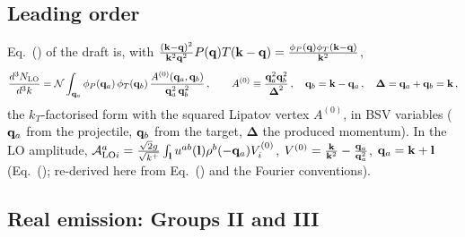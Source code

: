 \subsection{Leading order}
Eq.~() of the draft is, with $\frac{(\mathbf{k}-\mathbf{q})^2}{\mathbf{k}^2\mathbf{q}^2}P(\mathbf{q})T(\mathbf{k}-\mathbf{q})=\frac{\phi_P(\mathbf{q})\phi_T(\mathbf{k}-\mathbf{q})}{\mathbf{k}^2}$,
\begin{align}
\frac{d^3N_{\rm LO}}{d^3k}=\mathcal N\int_{\mathbf{q}_a}\phi_P(\mathbf{q}_a)\,\phi_T(\mathbf{q}_b)\,\frac{A^{(0)}(\mathbf{q}_a,\mathbf{q}_b)}{\mathbf{q}_a^2\,\mathbf{q}_b^2}\,,\qquad A^{(0)}\equiv\frac{\mathbf{q}_a^2\mathbf{q}_b^2}{\boldsymbol\Delta^2}\,,\quad\mathbf{q}_b=\mathbf{k}-\mathbf{q}_a\,,\quad\boldsymbol\Delta=\mathbf{q}_a+\mathbf{q}_b=\mathbf{k}\,,\label{d:LO}
\end{align}
the $k_T$-factorised form with the squared Lipatov vertex $A^{(0)}$, in BSV variables ($\mathbf{q}_a$ from the projectile, $\mathbf{q}_b$ from the target, $\boldsymbol\Delta$ the produced momentum). In the LO amplitude, $\mathcal A^a_{{\rm LO}i}=\frac{\sqrt2g}{\sqrt{k^+}}\int_{\mathbf{l}}u^{ab}(\mathbf{l})\rho^b(-\mathbf{q}_a)V^{(0)}_i$, $V^{(0)}=\frac{\mathbf{k}}{\mathbf{k}^2}-\frac{\mathbf{q}_a}{\mathbf{q}_a^2}$, $\mathbf{q}_a=\mathbf{k}+\mathbf{l}$ (Eq.~(); re-derived here from Eq.~() and the Fourier conventions).

\subsection{Real emission: Groups II and III}\label{sec:d-real}
